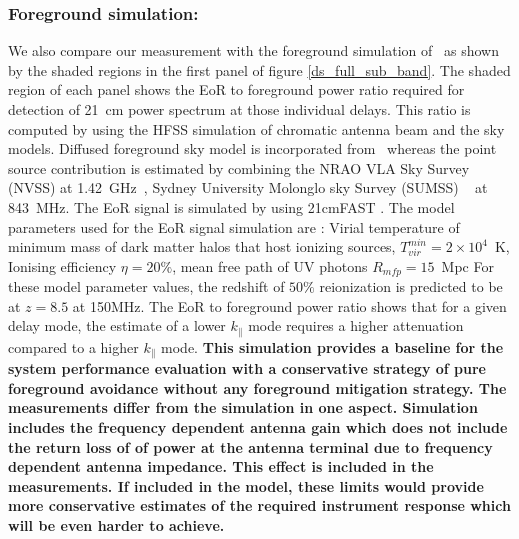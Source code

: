\documentclass[twocolumn]{emulateapj}
\begin{document}
     \subsubsection{Foreground simulation:}  
    We also compare our measurement with the foreground simulation of~\citep{Thyagarajan_et_al2016} as shown by the shaded regions in the first panel of figure \ref{ds_full_sub_band}. The shaded region of each panel shows the EoR to
    foreground power ratio required for detection of 21~cm power spectrum at those
    individual delays. This ratio is computed by
    using the HFSS simulation of chromatic antenna beam and the sky models. Diffused foreground sky model is
    incorporated from~\citep{deolivieracosta_et_al2008} whereas the point source
    contribution is estimated by combining the NRAO VLA Sky Survey (NVSS) at
    1.42~GHz~\citep{Condon_1998}, Sydney University Molonglo sky Survey (SUMSS)
    ~\citep{Bock_et_al_1999, Mauch_et_al_2003} at 843~MHz. The EoR signal
    is simulated by using 21cmFAST \citep{Messinger_et_al2011}. The model
    parameters used for the EoR signal simulation
    are : Virial temperature of minimum mass of dark matter halos that host
    ionizing sources, $T_{vir}^{min} = 2\times10^4$~K, Ionising efficiency $\eta = 20\%$,
    mean free path of UV photons $R_{mfp} = 15$~Mpc For these model parameter
    values, the redshift of $50\%$ reionization is predicted to be at $z = 8.5$ at
    150MHz.  
    The EoR to foreground power ratio shows that for a given
    delay mode, the estimate of a lower $k_{\parallel}$ mode requires a higher
    attenuation compared to a higher $k_{\parallel}$ mode. 
    \textbf{This simulation provides a baseline for the system performance evaluation with a conservative strategy of pure foreground avoidance without any foreground mitigation strategy. The measurements differ from the simulation in one aspect. Simulation includes the frequency dependent antenna gain which does not include the return loss of of power at the antenna terminal due to frequency dependent antenna impedance. This effect is included in the measurements.
  If included in the model, these limits would provide more conservative estimates of the required instrument response which will be even harder to achieve.}
     
\end{document}
